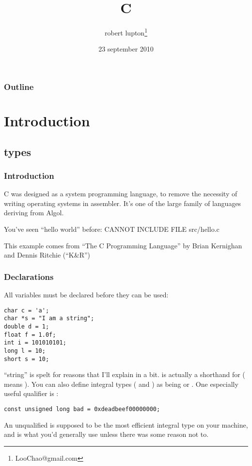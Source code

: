 \documentclass[10pt, t]{beamer}
\title{C}
\author{robert lupton\thanks{LooChao@gmail.com}}
\date{23 september 2010}
\begin{document}
\maketitle

\begin{frame}
\frametitle{Outline}
\setcounter{tocdepth}{3}
\tableofcontents
\end{frame}

\section{Introduction}
\label{sec-1}
\subsection{types}
\label{sec-1_1}
\begin{frame}
\frametitle{Introduction}
\label{sec-1_1_1}

C was designed as a system programming language, to remove the necessity of writing operating systems in
assembler.  It's one of the large family of languages deriving from Algol.

\pause
You've seen ``hello world'' before:
CANNOT INCLUDE FILE src/hello.c
\pause

This example comes from ``The C Programming Language'' by Brian Kernighan and Dennis Ritchie (``K\&R'')
\end{frame}
\begin{frame}[fragile]
\frametitle{Declarations}
\label{sec-1_1_2}

 All variables must be declared before they can be used:
\begin{verbatim}
char c = 'a';
char *s = "I am a string";
double d = 1;
float f = 1.0f;
int i = 101010101;
long l = 10;
short s = 10;
\end{verbatim}
\pause
``string'' is spelt  for reasons that I'll explain in a bit.
\pause
{} is actually a shorthand for  ( means ).  
You can also define integral types ( and ) as being  or . 
\pause One especially useful qualifier is :
\begin{verbatim}
const unsigned long bad = 0xdeadbeef00000000;
\end{verbatim}

\pause An unqualified  is supposed to be the most efficient integral type on your machine, and is
what you'd generally use unless there was some reason not to. 
\end{frame}
\end{document}
